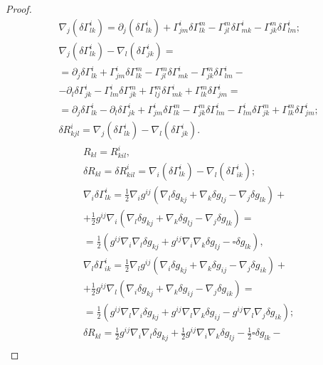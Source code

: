 \documentclass[a4paper, 14pt]{scrarticle}
\theoremstyle{Imperial}
\begin{document}
\begin{proof}
$$\begin{aligned}
			&\nabla_{j}\left(\delta\Gamma_{lk}^{i}\right)=\partial_{j}\left(\delta\Gamma_{lk}^{i}\right)+\Gamma_{jm}^{i}\delta\Gamma_{lk}^{m}-\Gamma_{jl}^{m}\delta\Gamma_{mk}^{i}-\Gamma_{jk}^{m}\delta\Gamma_{lm}^{i};\\ 		
			&\nabla_{j}\left(\delta\Gamma_{lk}^{i}\right)-\nabla_{l}\left(\delta\Gamma_{jk}^{i}\right)=\\		
			&=\partial_{j}\delta\Gamma_{lk}^{i}+\Gamma_{jm}^{i}\delta\Gamma_{lk}^{m}-\Gamma_{jl}^{m}\delta\Gamma_{mk}^{i}-\Gamma_{jk}^{m}\delta\Gamma_{lm}^{i}-\\	
			&-\partial_{l}\delta\Gamma_{jk}^{i}-\Gamma_{lm}^{i}\delta\Gamma_{jk}^{m}+\Gamma_{lj}^{m}\delta\Gamma_{mk}^{i}+\Gamma_{lk}^{m}\delta\Gamma_{jm}^{i}=\\		
			&=\partial_{j}\delta\Gamma_{lk}^{i}-\partial_{l}\delta\Gamma_{jk}^{i}+\Gamma_{jm}^{i}\delta\Gamma_{lk}^{m}-\Gamma_{jk}^{m}\delta\Gamma_{lm}^{i}-\Gamma_{lm}^{i}\delta\Gamma_{jk}^{m}+\Gamma_{lk}^{m}\delta\Gamma_{jm}^{i};\\
			&\delta R_{kjl}^{i}=\nabla_{j}\left(\delta\Gamma_{lk}^{i}\right)-\nabla_{l}\left(\delta\Gamma_{jk}^{i}\right).		
		\end{aligned}$$
		$$\begin{aligned}
			&R_{kl}=R_{kil}^{i},\\
			&\delta R_{kl}=\delta R_{kil}^{i}=\nabla_{i}\left(\delta\Gamma_{lk}^{i}\right)-\nabla_{l}\left(\delta\Gamma_{ik}^{i}\right);\\
			&\nabla_{i}\delta\Gamma_{lk}^{i}=\frac{1}{2}\nabla_{i}g^{ij}\left(\nabla_{l}\delta g_{kj}+\nabla_{k}\delta g_{lj}-\nabla_{j}\delta g_{lk}\right)+\\ &+\frac{1}{2}g^{ij}\nabla_{i}\left(\nabla_{l}\delta g_{kj}+\nabla_{k}\delta g_{lj}-\nabla_{j}\delta g_{lk}\right)=\\
			&=\frac{1}{2}\left(g^{ij}\nabla_{i}\nabla_{l}\delta g_{kj}+g^{ij}\nabla_{i}\nabla_{k}\delta g_{lj}-\square\delta g_{lk}\right),\\
			&\nabla_{l}\delta\Gamma_{ik}^{i}=\frac{1}{2}\nabla_{l}g^{ij}\left(\nabla_{i}\delta g_{kj}+\nabla_{k}\delta g_{ij}-\nabla_{j}\delta g_{ik}\right)+\\
			&+ \frac{1}{2}g^{ij}\nabla_{l}\left(\nabla_{i}\delta g_{kj}+\nabla_{k}\delta g_{ij}-\nabla_{j}\delta g_{ik}\right)=\\			
			&=\frac{1}{2}\left(g^{ij}\nabla_{l}\nabla_{i}\delta g_{kj}+g^{ij}\nabla_{l}\nabla_{k}\delta g_{ij}-g^{ij}\nabla_{l}\nabla_{j}\delta g_{ik}\right);\\
			&\delta R_{kl}=\frac{1}{2}g^{ij}\nabla_{i}\nabla_{l}\delta g_{kj}+\frac{1}{2}g^{ij}\nabla_{i}\nabla_{k}\delta g_{lj}-\frac{1}{2}\square\delta g_{lk}-\\

\end{aligned}$$
\end{proof}
\end{document}
